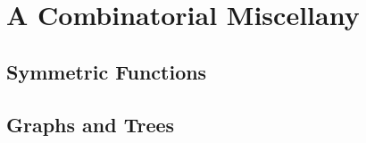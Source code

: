 
\chapter{A Combinatorial Miscellany}






\section{Symmetric Functions}


\section{Graphs and Trees}




\endinput
